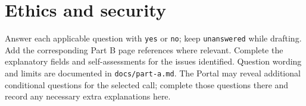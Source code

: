 \clearpage
\section{Ethics and security}
\begin{heguidance}
Answer each applicable question with \texttt{yes} or \texttt{no}; keep
\texttt{unanswered} while drafting. Add the corresponding Part B page references
where relevant. Complete the explanatory fields and self-assessments for the issues
identified. Question wording and limits are documented in \texttt{docs/part-a.md}.
The Portal may reveal additional conditional questions for the selected call;
complete those questions there and record any necessary extra explanations here.
\end{heguidance}





